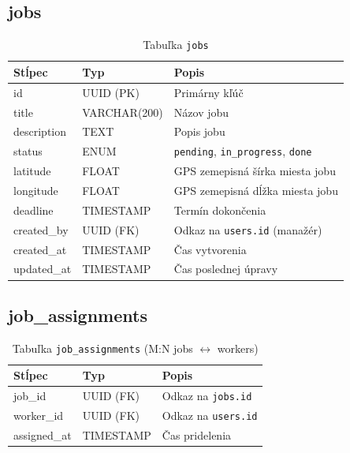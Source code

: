 \subsection{jobs}
\begin{table}[H]
  \centering
  \begin{tabularx}{\textwidth}{llX}
    \toprule
    \textbf{Stĺpec} & \textbf{Typ} & \textbf{Popis} \\
    \midrule
    id            & UUID (PK)     & Primárny kľúč \\
    title         & VARCHAR(200)  & Názov jobu \\
    description   & TEXT          & Popis jobu \\
    status        & ENUM          & \texttt{pending}, \texttt{in\_progress}, \texttt{done} \\
    latitude      & FLOAT         & GPS zemepisná šírka miesta jobu \\
    longitude     & FLOAT         & GPS zemepisná dĺžka miesta jobu \\
    deadline      & TIMESTAMP     & Termín dokončenia \\
    created\_by   & UUID (FK)     & Odkaz na \texttt{users.id} (manažér) \\
    created\_at   & TIMESTAMP     & Čas vytvorenia \\
    updated\_at   & TIMESTAMP     & Čas poslednej úpravy \\
    \bottomrule
  \end{tabularx}
  \caption{Tabuľka \texttt{jobs}}
\end{table}

\subsection{job\_assignments}
\begin{table}[H]
  \centering
  \begin{tabularx}{\textwidth}{llX}
    \toprule
    \textbf{Stĺpec} & \textbf{Typ} & \textbf{Popis} \\
    \midrule
    job\_id    & UUID (FK) & Odkaz na \texttt{jobs.id} \\
    worker\_id & UUID (FK) & Odkaz na \texttt{users.id} \\
    assigned\_at & TIMESTAMP & Čas pridelenia \\
    \bottomrule
  \end{tabularx}
  \caption{Tabuľka \texttt{job\_assignments} (M:N jobs $\leftrightarrow$ workers)}
\end{table}

